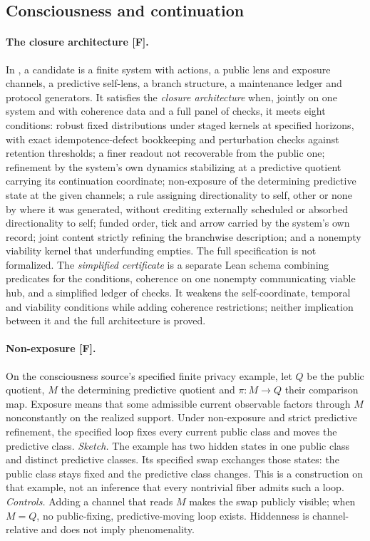 \documentclass[pdflatex,sn-basic]{sn-jnl}%
\newcommand{\slot}[1]{}%
\begin{document}
\begin{appendices}
\subsection{Consciousness and continuation}\label{app:consciousness}

\slot{A.5}
\paragraph{The closure architecture [F].} In \citet{tsiokos2026consciousness}, a candidate is a finite system with actions, a public lens and exposure channels, a predictive self-lens, a branch structure, a maintenance ledger and protocol generators. It satisfies the \emph{closure architecture} when, jointly on one system and with coherence data and a full panel of checks, it meets eight conditions: robust fixed distributions under staged kernels at specified horizons, with exact idempotence-defect bookkeeping and perturbation checks against retention thresholds; a finer readout not recoverable from the public one; refinement by the system's own dynamics stabilizing at a predictive quotient carrying its continuation coordinate; non-exposure of the determining predictive state at the given channels; a rule assigning directionality to self, other or none by where it was generated, without crediting externally scheduled or absorbed directionality to self; funded order, tick and arrow carried by the system's own record; joint content strictly refining the branchwise description; and a nonempty viability kernel that underfunding empties. The full specification is not formalized. The \emph{simplified certificate} is a separate Lean schema combining predicates for the conditions, coherence on one nonempty communicating viable hub, and a simplified ledger of checks. It weakens the self-coordinate, temporal and viability conditions while adding coherence restrictions; neither implication between it and the full architecture is proved.

\paragraph{Non-exposure [F].} On the consciousness source's specified finite privacy example, let $Q$ be the public quotient, $M$ the determining predictive quotient and $\pi:M\to Q$ their comparison map. Exposure means that some admissible current observable factors through $M$ nonconstantly on the realized support. Under non-exposure and strict predictive refinement, the specified loop fixes every current public class and moves the predictive class. \emph{Sketch.} The example has two hidden states in one public class and distinct predictive classes. Its specified swap exchanges those states: the public class stays fixed and the predictive class changes. This is a construction on that example, not an inference that every nontrivial fiber admits such a loop. \emph{Controls.} Adding a channel that reads $M$ makes the swap publicly visible; when $M=Q$, no public-fixing, predictive-moving loop exists. Hiddenness is channel-relative and does not imply phenomenality.


\end{appendices}
\end{document}
